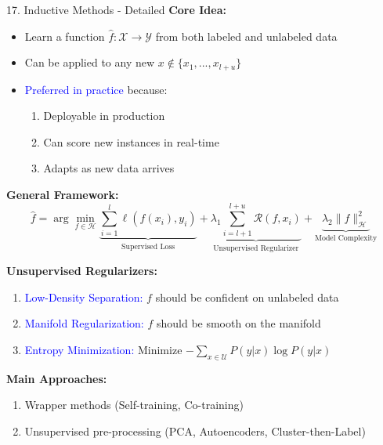 \documentclass[8pt]{beamer}
\begin{document}
	\begin{frame}{17. Inductive Methods - Detailed}
		\fontsize{6.5}{7.5}\selectfont
		\textbf{Core Idea:}
		\begin{itemize}
			\item Learn a function $\hat{f}: \mathcal{X} \rightarrow \mathcal{Y}$ from both labeled and unlabeled data
			\item Can be applied to any new $x \notin \{x_1,...,x_{l+u}\}$
			\item \textcolor{blue}{Preferred in practice} because:
			\begin{enumerate}
				\item Deployable in production
				\item Can score new instances in real-time
				\item Adapts as new data arrives
			\end{enumerate}
		\end{itemize}
		
		\textbf{General Framework:}
		\[
		\hat{f} = \arg\min_{f \in \mathcal{H}} \underbrace{\sum_{i=1}^l \ell(f(x_i), y_i)}_{\text{Supervised Loss}} + \underbrace{\lambda_1 \sum_{i=l+1}^{l+u} \mathcal{R}(f, x_i)}_{\text{Unsupervised Regularizer}} + \underbrace{\lambda_2 \|f\|_{\mathcal{H}}^2}_{\text{Model Complexity}}
		\]
		
		\textbf{Unsupervised Regularizers:}
		\begin{enumerate}
			\item \textcolor{blue}{Low-Density Separation:} $f$ should be confident on unlabeled data
			\item \textcolor{blue}{Manifold Regularization:} $f$ should be smooth on the manifold
			\item \textcolor{blue}{Entropy Minimization:} Minimize $-\sum_{x \in \mathcal{U}} P(y|x) \log P(y|x)$
		\end{enumerate}
		
		\textbf{Main Approaches:}
		\begin{enumerate}
			\item Wrapper methods (Self-training, Co-training)
			\item Unsupervised pre-processing (PCA, Autoencoders, Cluster-then-Label)
		\end{enumerate}
	\end{frame}
	
\end{document}
